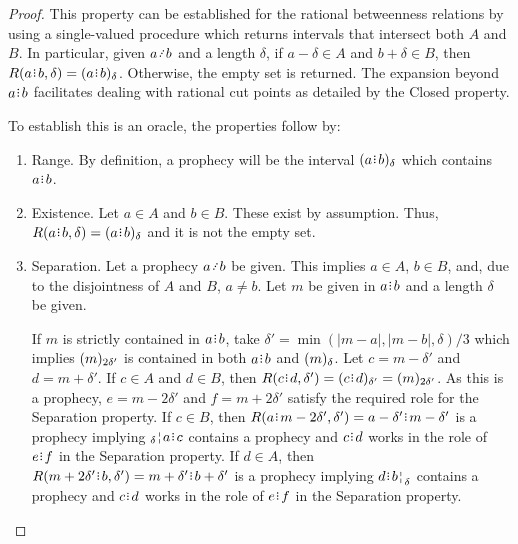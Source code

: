\documentclass[12pt]{article}
\begin{document}
\begin{proof}
This property can be established for the rational betweenness relations by using a single-valued procedure which returns intervals that intersect both $A$ and $B$. In particular, given $a \lte b$ and a length $\delta$, if $a-\delta \in A$ and $b+\delta \in B$, then $R(a\rint b, \delta) = \halo{a\rint b}$. Otherwise, the empty set is returned. The expansion beyond $a\rint b$ facilitates dealing with rational cut points as detailed by the Closed property. 

To establish this is an oracle, the properties follow by:  
\begin{enumerate}
    \item Range. By definition, a prophecy will be the interval $\halo{a\rint b}$ which contains $a\rint b$. 
    
    \item Existence. Let $a \in A$ and $b \in B$. These exist by assumption. Thus, $R(a\rint b, \delta)= \halo{a\rint b}$  and it is not the empty set.
    
    \item Separation. Let a prophecy $a \lte b$ be given. This implies $a \in A$, $b \in B$, and, due to the disjointness of $A$ and $B$, $a \neq b$. Let $m$ be given in $a\rint b$ and a length $\delta$ be given. 
    
    If $m$ is strictly contained in $a\rint b$, take $\delta'= \min(|m-a|, |m-b|, \delta)/3$ which implies $\halo[2\delta']{m}$ is contained in both $a\rint b$ and $\halo{m}$.  Let $c = m-\delta'$ and $d=m+\delta'$. If $c \in A$ and $d \in B$, then $R(c\rint d, \delta') = \halo[\delta']{c\rint d} = \halo[2 \delta']{m}$. As this is a prophecy, $e = m - 2 \delta'$ and $f = m + 2 \delta'$ satisfy the required role for the Separation property. If $ c\in B$, then $R(a\rint m-2\delta', \delta') = a-\delta'\rint m-\delta'$ is a prophecy implying $\fuzbleft{a} \rint  c$ contains a prophecy and $c\rint d$ works in the role of $e\rint f$ in the Separation property. If $d \in A$, then $R(m+2\delta'\rint b, \delta') = m+\delta'\rint b+\delta'$ is a prophecy implying $d\rint \fuzbright{b}$ contains a prophecy and $c\rint d$ works in the role of $e\rint f$ in the Separation property. 


\end{enumerate}
\end{proof}
\end{document}
